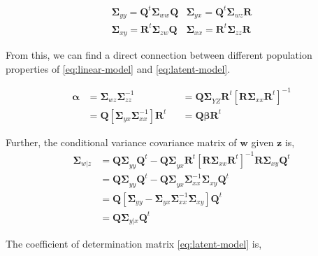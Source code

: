 \documentclass[num-refs]{wiley-article}
\providecommand{\tightlist}{%
  \setlength{\itemsep}{0pt}\setlength{\parskip}{0pt}}
\begin{document}
\begin{equation}
  \begin{matrix}
    \boldsymbol{\Sigma}_{yy} = \mathbf{Q}^t \boldsymbol{\Sigma}_{ww} \mathbf{Q} &
    \boldsymbol{\Sigma}_{yx} = \mathbf{Q}^t \boldsymbol{\Sigma}_{wz} \mathbf{R} \\
    \boldsymbol{\Sigma}_{xy} = \mathbf{R}^t \boldsymbol{\Sigma}_{zw} \mathbf{Q} &
    \boldsymbol{\Sigma}_{xx} = \mathbf{R}^t \boldsymbol{\Sigma}_{zz} \mathbf{R}
  \end{matrix}
  \label{eq:cov-yx-wz}
\end{equation}

From this, we can find a direct connection between different population
properties of \eqref{eq:linear-model} and \eqref{eq:latent-model}.

\begin{description}
\tightlist
\item[Regression Coefficients]
\[
  \begin{aligned}
  \boldsymbol{\alpha} &= \boldsymbol{\Sigma}_{wz} \boldsymbol{\Sigma}_{zz}^{-1}
  &&= \boldsymbol{Q\Sigma}_{YZ}\mathbf{R}^t\left[\boldsymbol{R\Sigma}_{xx}\mathbf{R}^t\right]^{-1} \\
  &= \mathbf{Q}\left[\boldsymbol{\Sigma}_{yx}\boldsymbol{\Sigma}_{xx}^{-1}\right]\mathbf{R}^t
  &&= \mathbf{Q}\boldsymbol{\beta}\mathbf{R}^t
  \end{aligned}
  \]
\item[Conditional Variance]
Further, the conditional variance covariance matrix of \(\mathbf{w}\)
given \(\mathbf{z}\) is, \[
  \begin{aligned}
\boldsymbol{\Sigma}_{w|z}
&= \boldsymbol{Q\Sigma}_{yy}\mathbf{Q}^t -
  \boldsymbol{Q \Sigma}_{yx}\mathbf{R}^t \left[\boldsymbol{R\Sigma}_{xx}\boldsymbol{R}^t\right]^{-1}
  \boldsymbol{R\Sigma}_{xy}\mathbf{Q}^t \nonumber \\
&= \boldsymbol{Q\Sigma}_{yy}\mathbf{Q}^t - 
  \boldsymbol{Q \Sigma}_{yx}\boldsymbol{\Sigma}_{xx}^{-1}\boldsymbol{\Sigma}_{xy}\mathbf{Q}^t \nonumber \\
&= \mathbf{Q}\left[\boldsymbol{\Sigma}_{yy} -
  \boldsymbol{\Sigma}_{yx}\boldsymbol{\Sigma}_{xx}^{-1}\boldsymbol{\Sigma}_{xy}\right]\mathbf{Q}^{t} \nonumber \\
&= \mathbf{Q} \boldsymbol{\Sigma}_{y|x}\mathbf{Q}^t
  \end{aligned}
  \]
\item[Coefficient of Determination]
The coefficient of determination matrix \eqref{eq:latent-model} is, \[
\]
\end{description}
\end{document}
